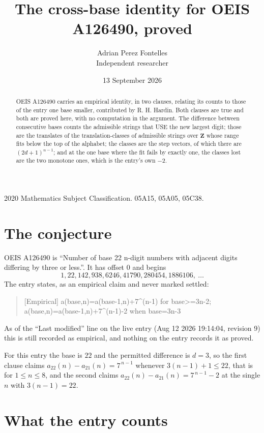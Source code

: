 \documentclass[11pt,a4paper]{article}
\title{The cross-base identity for OEIS A126490, proved}
\author{Adrian Perez Fontelles\\ \small Independent researcher}
\date{13 September 2026}
\theoremstyle{plain}
\theoremstyle{definition}
\begin{document}
\maketitle

\begin{abstract}
OEIS A126490 carries an empirical identity, in two clauses, relating its counts to those of the
entry one base smaller, contributed by R. H. Hardin. Both clauses are true and both are proved
here, with no computation in the argument. The difference between consecutive bases counts the
admissible strings that USE the new largest digit; those are the translates of the
translation-classes of admissible strings over $\mathbf{Z}$ whose range fits below the top of
the alphabet; the classes are the step vectors, of which there are $(2d+1)^{n-1}$; and at the
one base where the fit fails by exactly one, the classes lost are the two monotone ones, which
is the entry's own $-2$.
\end{abstract}

\noindent\small 2020 Mathematics Subject Classification. 05A15, 05A05, 05C38.\normalsize

\section{The conjecture}

OEIS A126490 is ``Number of base 22 n-digit numbers with adjacent digits differing by three or less.''. It has offset $0$ and begins
\[
1, 22, 142, 938, 6246, 41790, 280454, 1886106,\ \dots
\]
The entry states, as an empirical claim and never marked settled:
\begin{quote}
[Empirical] a(base,n)=a(base-1,n)+7\textasciicircum{}(n-1) for base>=3n-2; a(base,n)=a(base-1,n)+7\textasciicircum{}(n-1)-2 when base=3n-3
\end{quote}
As of the ``Last modified'' line on the live entry (Aug 12 2026 19:14:04, revision 9)
this is still recorded as empirical, and nothing on the entry records it as proved.

For this entry the base is $22$ and the permitted difference is $d=3$, so the first clause
claims $a_{22}(n)-a_{21}(n)=7^{\,n-1}$ whenever $3(n-1)+1\le22$, that is for
$1\le n\le8$, and the second claims $a_{22}(n)-a_{21}(n)=7^{\,n-1}-2$ at the single
$n$ with $3(n-1)=22$.

\section{What the entry counts}
\end{document}

